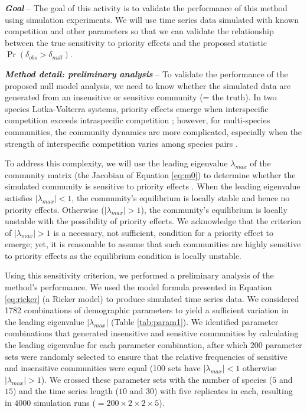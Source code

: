 \documentclass[12pt, class=article, crop=false]{standalone}
\begin{document}
\textbf{\textit{Goal}} -- 
The goal of this activity is to validate the performance of this method using simulation experiments.
We will use time series data simulated with known competition and other parameters so that we can validate the relationship between the true sensitivity to priority effects and the proposed statistic $\Pr(\delta_{obs} > \delta_{null})$.

\textbf{\textit{Method detail: preliminary analysis}} -- 
To validate the performance of the proposed null model analysis, we need to know whether the simulated data are generated from an insensitive or sensitive community (= the truth).
In two species Lotka-Volterra systems, priority effects emerge when interspecific competition exceeds intraspecific competition \citep{ke_coexistence_2018}; however, for multi-species communities, the community dynamics are more complicated, especially when the strength of interspecific competition varies among species pairs \citep{barabas_chessons_2018}.

To address this complexity, we will use the leading eigenvalue $\lambda_{max}$ of the community matrix (the Jacobian of Equation \ref{eq:m0}) to determine whether the simulated community is sensitive to priority effects \citep{otto_biologists_2011}.
When the leading eigenvalue satisfies $|\lambda_{max}| < 1$, the community's equilibrium is locally stable and hence no priority effects.
Otherwise ($|\lambda_{max}| > 1$), the community's equilibrium is locally unstable with the possibility of priority effects.
We acknowledge that the criterion of $|\lambda_{max}| > 1$ is a necessary, not sufficient, condition for a priority effect to emerge; yet, it is reasonable to assume that such communities are highly sensitive to priority effects as the equilibrium condition is locally unstable. 

Using this sensitivity criterion, we performed a preliminary analysis of the method's performance.
We used the model formula presented in Equation \ref{eq:ricker} (a Ricker model) to produce simulated time series data.
We considered 1782 combinations of demographic parameters to yield a sufficient variation in the leading eigenvalue $|\lambda_{max}|$ (Table \ref{tab:param1}).
We identified parameter combinations that generated insensitive and sensitive communities by calculating the leading eigenvalue for each parameter combination, after which 200 parameter sets were randomly selected to ensure that the relative frequencies of sensitive and insensitive communities were equal (100 sets have $|\lambda_{max}| < 1$ otherwise $|\lambda_{max}| > 1$).
We crossed these parameter sets with the number of species ($5$ and $15$) and the time series length ($10$ and $30$) with five replicates in each, resulting in $4000$ simulation runs ($= 200 \times 2 \times 2 \times 5$).
\end{document}
